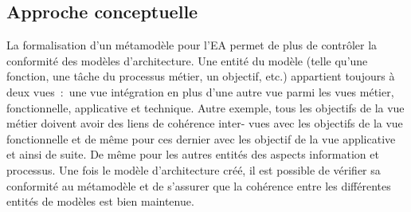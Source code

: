 

   \subsection{Approche conceptuelle}







La formalisation d'un métamodèle pour l'EA permet de plus de
contrôler la conformité des modèles d'architecture. Une entité du modèle
(telle qu'une fonction, une tâche du processus métier, un objectif, etc.)
appartient toujours à deux vues~:~une vue intégration en plus d'une autre vue
parmi les vues métier, fonctionnelle, applicative et technique. Autre exemple,
tous les objectifs de la vue métier doivent avoir des liens de cohérence inter-
vues avec les objectifs de la vue fonctionnelle et de même pour ces dernier
avec les objectif de la vue applicative et ainsi de suite. De même pour les
autres entités des aspects information et processus. Une fois le modèle
d'architecture créé, il est possible de vérifier sa conformité au métamodèle et
de s'assurer que la cohérence entre les différentes entités de modèles est bien
maintenue.

